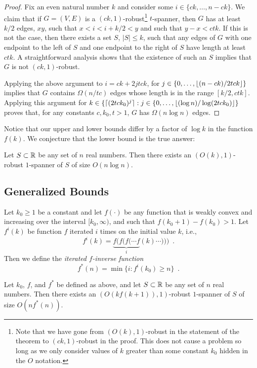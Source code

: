 \documentclass{patmorin}
\begin{document}
\begin{proof}
Fix an even natural number $k$ and consider some $i\in\{ck,\ldots,n-ck\}$.
We claim that if $G=(V,E)$ is a $(ck,1)$-robust\footnote{Note that we
have gone from $(O(k),1)$-robust in the statement of the theorem to
$(ck,1)$-robust in the proof.  This does not cause a problem so long
as we only consider values of $k$ greater than some constant $k_0$
hidden in the $O$ notation.} $t$-spanner, then $G$ has at least $k/2$
edges, $xy$, such that $x < i < i+k/2 < y$ and such that $y-x < ctk$.
If this is not the case, then there exists a set $S$, $|S|\le k$,
such that any edges of $G$ with one endpoint to the left of $S$
and one endpoint to the right of $S$ have length at least $ctk$.
A straightforward analysis shows that the existence of such an $S$
implies that $G$ is not $(ck,1)$-robust.

Applying the above argument to $i=ck+2jtck$, for
$j\in\{0,\ldots,{\lfloor (n-ck)/2tck \rfloor}\}$ implies that $G$ contains $\Omega(n/tc)$
edges whose length is in the range $[k/2,ctk]$.  Applying this
argument for $k\in\{{\lceil (2tck_0)^{j} \rceil} : j\in\{0,\ldots,{\lfloor (\log
n)/\log(2tck_0) \rfloor}\}$ proves that, for any constants $c,k_0,t>1$, $G$
has $\Omega(n\log n)$ edges.
\end{proof}

Notice that our upper and lower bounds differ by a factor of $\log k$ in the
function $f(k)$.  We conjecture that the lower bound is the true answer:

\begin{conj}
Let $S\subset \mathbb{R}$ be any set of $n$ real numbers.  Then there exists an
$(O(k),1)$-robust $1$-spanner of $S$ of size $O(n\log n)$.
\end{conj}

\subsection{Generalized Bounds}

Let $k_0\ge 1$ be a constant and let $f(\cdot)$ be any function that is
weakly convex and increasing over the interval $[k_0,\infty)$, and such
that $f(k_0+1)-f(k_0) > 1$.  Let $f^{i}(k)$ be function $f$ iterated
$i$ times on the initial value $k$, i.e.,
\[
   f^{i}(k) = \underbrace{f(f(f(\cdots f}_{i}(k)\cdots))) \enspace .
\]
Then we define the \emph{iterated
$f$-inverse function}
\[
   f^*(n) = \min\{i : f^{i}(k_0) \ge n\} \enspace .
\] 

\begin{thm}
Let $k_0$, $f$, and $f^*$ be defined as above, and let $S\subset \mathbb{R}$ be
any set of $n$ real numbers.  Then there exists an $(O(kf(k+1)),1)$-robust
$1$-spanner of $S$ of size $O(nf^*(n))$.
\end{thm}
\end{document}
